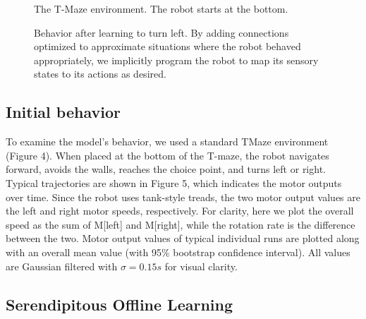 \documentclass[conference]{IEEEtran}
\begin{document}
\begin{figure}[!t]
\centering
\caption{The T-Maze environment. The robot starts at the bottom.}
\label{Tmaze}
\end{figure}

\begin{figure}[!t]
\centering
\caption{Behavior after learning to turn left. By adding connections optimized to approximate situations where the robot behaved appropriately, we implicitly program the robot to map its sensory states to its actions as desired.}
\label{Left}
\end{figure}

\subsection{Initial behavior}

To examine the model's behavior, we used a standard TMaze
environment (Figure 4). When placed at the bottom
of the T-maze, the robot navigates forward, avoids the
walls, reaches the choice point, and turns left or right.
Typical trajectories are shown in Figure 5, which indicates
the motor outputs over time. Since the robot uses tank-style
treads, the two motor output values are the left and right
motor speeds, respectively. For clarity, here we plot the
overall speed as the sum of M[left] and M[right], while
the rotation rate is the difference between the two. Motor output values of typical individual runs are plotted along
with an overall mean value (with 95\% bootstrap confidence
interval). All values are Gaussian filtered with $\sigma=0.15s$ for visual clarity.


\subsection{Serendipitous Offline Learning}
\end{document}

